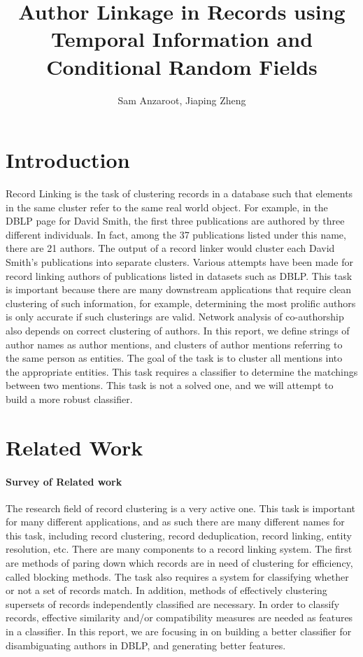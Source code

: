 \documentclass[twocolumn,letterpaper]{article}
\title{Author Linkage in Records using Temporal Information and Conditional Random Fields}
\author{Sam Anzaroot, Jiaping Zheng}
\date{}
\begin{document}
\ifpdf
{}
\else
{}
\fi

\maketitle

\section{Introduction} %
\label{sec:introduction}
Record Linking is the task of clustering records in a database such that elements in the same cluster refer to the same real world object. For example, in the DBLP page for David Smith, the first three publications are authored by three different individuals.  In fact, among the 37 publications listed under this name, there are 21 authors.  The output of a record linker would cluster each David Smith's publications into separate clusters. Various attempts have been made for record linking authors of publications listed in datasets such as DBLP. This task is important because there are many downstream applications that require clean clustering of such information, for example, determining the most prolific authors is only accurate if such clusterings are valid. Network analysis of co-authorship also depends on correct clustering of authors. In this report, we define strings of author names as author mentions, and clusters of author mentions referring to the same person as entities. The goal of the task is to cluster all mentions into the appropriate entities. This task requires a classifier to determine the matchings between two mentions. This task is not a solved one, and we will attempt to build a more robust classifier.

\section{Related Work} %
\label{sec:related_work}
\paragraph{Survey of Related work} %
\label{par:survey_of_related_work}
The research field of record clustering is a very active one. This task is important for many different applications, and as such there are many different names for this task, including record clustering, record deduplication, record linking, entity resolution, etc. There are many components to a record linking system. The first are methods of paring down which records are in need of clustering for efficiency, called blocking methods. The task also requires a system for classifying whether or not a set of records match. In addition, methods of effectively clustering supersets of records independently classified are necessary. In order to classify records, effective similarity and/or compatibility measures are needed as features in a classifier. In this report, we are focusing in on building a better classifier for disambiguating authors in DBLP, and generating better features.
\end{document}
